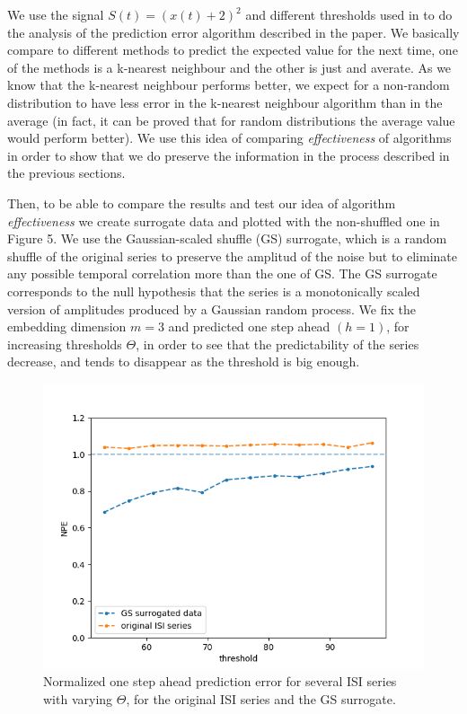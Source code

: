 \documentclass[10pt]{article}
\begin{document}
We use the signal $S(t)=(x(t)+2)^2$ and different thresholds used in \cite{interspike} to do the analysis of the prediction error algorithm described in the paper. We basically compare to different methods to predict the expected value for the next time, one of the methods is a k-nearest neighbour and the other is just and averate. As we know that the k-nearest neighbour performs better, we expect for a non-random distribution to have less error in the k-nearest neighbour algorithm than in the average (in fact, it can be proved that for random distributions the average value would perform better). We use this idea of comparing \textit{effectiveness} of algorithms in order to show that we do preserve the information in the process described in the previous sections. 

Then, to be able to compare the results and test our idea of algorithm \textit{effectiveness}  we create surrogate data \cite{surrogate} and plotted with the non-shuffled one in Figure 5. We use the Gaussian-scaled shuffle (GS) surrogate, which is a random shuffle of the original series to preserve the amplitud of the noise but to eliminate any possible temporal correlation more than the one of GS. The GS surrogate corresponds to the null hypothesis that the series is a monotonically scaled version of amplitudes produced by a Gaussian random process. We fix the embedding dimension $m=3$ and predicted one step ahead $(h=1)$, for increasing thresholds $\Theta$, in order to see that the predictability of the series decrease, and tends to disappear as the threshold is big enough.

\begin{figure}[h!]
\centering
\includegraphics[scale=0.5]{NPE_12series_copy}
\caption{Normalized one step ahead prediction error for several ISI series with varying $\Theta$, for the original ISI series and the GS surrogate.}
\label{fig:12series}
\end{figure}
\end{document}
